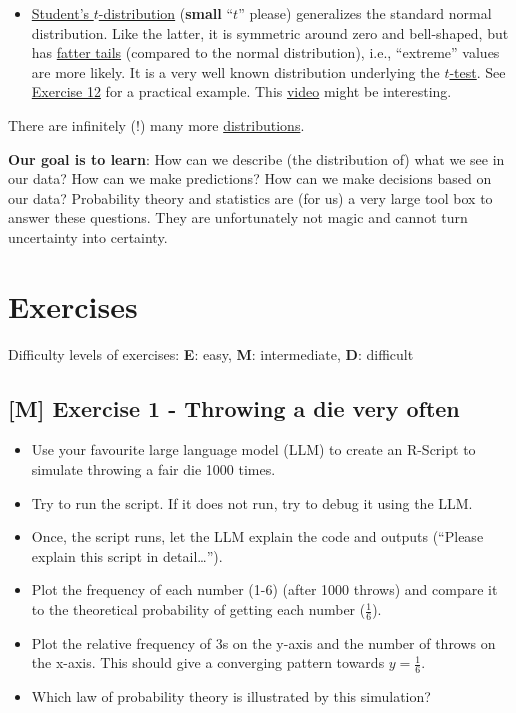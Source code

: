 \documentclass[
]{book}
\providecommand{\tightlist}{%
  \setlength{\itemsep}{0pt}\setlength{\parskip}{0pt}}
\begin{document}
\begin{itemize}
  This \href{https://www.youtube.com/watch?v=2kg1O0j1J9c&ab_channel=zedstatistics}{video} might be interesting.
\item
  \href{https://en.wikipedia.org/wiki/Student\%27s_t-distribution}{Student's \(t\)-distribution} (\textbf{small} ``\(t\)'' please) generalizes
  the standard normal distribution. Like the latter, it is symmetric around zero and bell-shaped, but
  has \href{https://en.wikipedia.org/wiki/Fat-tailed_distribution}{fatter tails} (compared to the normal distribution), i.e.,
  ``extreme'' values are more likely. It is a very well known distribution underlying the \href{https://en.wikipedia.org/wiki/Student\%27s_t-test}{\(t\)-test}.
  See \hyperref[exercise12]{Exercise 12} for a practical example.
  This \href{https://www.youtube.com/watch?v=Uv6nGIgZMVw&ab_channel=jbstatistics}{video} might be interesting.
\end{itemize}

There are infinitely (!) many more \href{https://en.wikipedia.org/wiki/List_of_probability_distributions}{distributions}.

\textbf{Our goal is to learn}: How can we describe (the distribution of) what we see in our data?
How can we make predictions? How can we make decisions based on our data?
Probability theory and statistics are (for us) a very large tool box to answer these questions.
They are unfortunately not magic and cannot turn uncertainty into certainty.

\section{Exercises}\label{exercises}

Difficulty levels of exercises:
\textbf{E}: easy,
\textbf{M}: intermediate,
\textbf{D}: difficult

\subsection{{[}M{]} Exercise 1 - Throwing a die very often}\label{exercise1}

\begin{itemize}
\tightlist
\item
  Use your favourite large language model (LLM) to create an R-Script to simulate throwing a fair die 1000 times.
\item
  Try to run the script. If it does not run, try to debug it using the LLM.
\item
  Once, the script runs, let the LLM explain the code and outputs (``Please explain this script in detail\ldots{}'').
\item
  Plot the frequency of each number (1-6) (after 1000 throws) and compare it to the theoretical probability of getting each number (\(\frac{1}{6}\)).
\item
  Plot the relative frequency of 3s on the y-axis and the number of throws on the x-axis. This should give a converging pattern towards \(y=\frac{1}{6}\).
\item
  Which law of probability theory is illustrated by this simulation?
\end{itemize}
\end{document}
